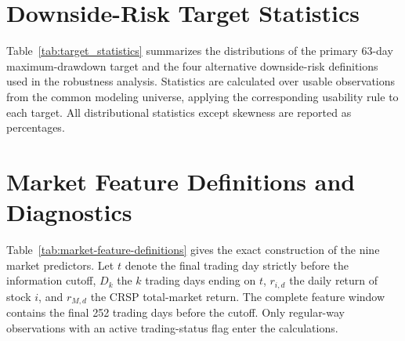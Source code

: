 

\section{Downside-Risk Target Statistics}
\label{app:target_statistics}

Table~\ref{tab:target_statistics} summarizes the distributions of the primary 63-day maximum-drawdown target and the four alternative downside-risk definitions used in the robustness analysis. Statistics are calculated over usable observations from the common modeling universe, applying the corresponding usability rule to each target. All distributional statistics except skewness are reported as percentages.



\section{Market Feature Definitions and Diagnostics}
\label{app:market_features}

Table~\ref{tab:market-feature-definitions} gives the exact construction of the nine market predictors. Let $t$ denote the final trading day strictly before the information cutoff, $D_k$ the $k$ trading days ending on $t$, $r_{i,d}$ the daily return of stock $i$, and $r_{M,d}$ the CRSP total-market return. The complete feature window contains the final 252 trading days before the cutoff. Only regular-way observations with an active trading-status flag enter the calculations.

